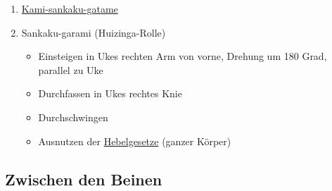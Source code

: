 \documentclass[justified, a4paper, notitlepage, captions=tableheading, nobib]{tufte-handout}
\begin{document}
\begin{itemize}
\begin{enumerate}
\item \hyperref[orgfe1fdeb]{Kami-sankaku-gatame}
\item Sankaku-garami (Huizinga-Rolle)
\begin{itemize}
\item Einsteigen in Ukes rechten Arm von vorne, Drehung um 180 Grad, parallel zu Uke
\item Durchfassen in Ukes rechtes Knie
\item Durchschwingen
\item Ausnutzen der \hyperref[org6c6f271]{Hebelgesetze} (ganzer Körper)
\end{itemize}
\end{enumerate}
\end{itemize}

\subsection{\label{org9bede9d}Zwischen den Beinen }
\label{sec:org7844033}
\end{document}
